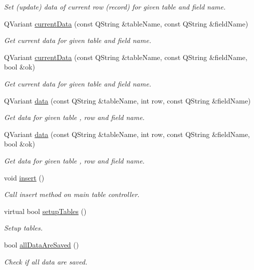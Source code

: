 \begin{DoxyCompactItemize}
\begin{DoxyCompactList}\small\item\em Set (update) data of current row (record) for given table and field name. \end{DoxyCompactList}\item 
Q\-Variant \hyperlink{classmdt_sql_form_aca283557b7e2586779cb5c498d388f14}{current\-Data} (const Q\-String \&table\-Name, const Q\-String \&field\-Name)
\begin{DoxyCompactList}\small\item\em Get current data for given table and field name. \end{DoxyCompactList}\item 
Q\-Variant \hyperlink{classmdt_sql_form_af24711f9c18a1009352b62d47b9758d7}{current\-Data} (const Q\-String \&table\-Name, const Q\-String \&field\-Name, bool \&ok)
\begin{DoxyCompactList}\small\item\em Get current data for given table and field name. \end{DoxyCompactList}\item 
Q\-Variant \hyperlink{classmdt_sql_form_a0c27d6a9ecbf0589f313c7193c632a62}{data} (const Q\-String \&table\-Name, int row, const Q\-String \&field\-Name)
\begin{DoxyCompactList}\small\item\em Get data for given table , row and field name. \end{DoxyCompactList}\item 
Q\-Variant \hyperlink{classmdt_sql_form_ab0c251a35567dd34f244fea715a7a3d4}{data} (const Q\-String \&table\-Name, int row, const Q\-String \&field\-Name, bool \&ok)
\begin{DoxyCompactList}\small\item\em Get data for given table , row and field name. \end{DoxyCompactList}\item 
void \hyperlink{classmdt_sql_form_a2138e4e1236a9b1c002825ddd9e59298}{insert} ()
\begin{DoxyCompactList}\small\item\em Call insert method on main table controller. \end{DoxyCompactList}\item 
virtual bool \hyperlink{classmdt_sql_form_a27fe6e45aa5d4d7782aad9833e6de20b}{setup\-Tables} ()
\begin{DoxyCompactList}\small\item\em Setup tables. \end{DoxyCompactList}\item 
bool \hyperlink{classmdt_sql_form_a1e14cbb5bf04d2eb1c703862a6084031}{all\-Data\-Are\-Saved} ()
\begin{DoxyCompactList}\small\item\em Check if all data are saved. \end{DoxyCompactList}\end{DoxyCompactItemize}
